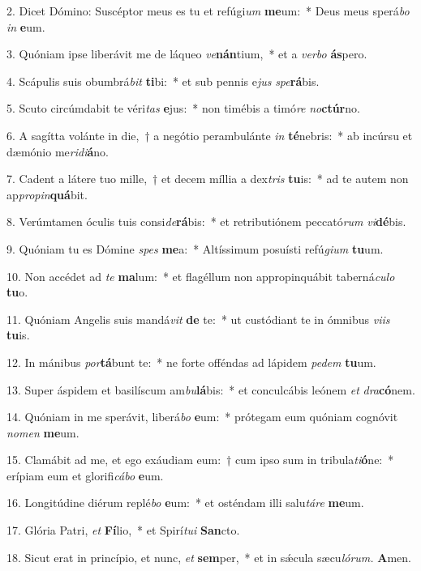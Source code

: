 \item 2. Dicet Dómino: Suscéptor meus es tu et refúgi\textit{um} \textbf{me}um:~* Deus meus sperá\textit{bo} \textit{in} \textbf{e}um.
\item 3. Quóniam ipse liberávit me de láqueo \textit{ve}\textbf{nán}tium,~* et a \textit{verbo} \textbf{ás}pero.
\item 4. Scápulis suis obumbrá\textit{bit} \textbf{ti}bi:~* et sub pennis e\textit{jus} \textit{spe}\textbf{rá}bis.
\item 5. Scuto circúmdabit te véri\textit{tas} \textbf{e}jus:~* non timébis a timó\textit{re} \textit{no}\textbf{ctúr}no.
\item 6. A sagítta volánte in die,~† a negótio perambulánte \textit{in} \textbf{té}nebris:~* ab incúrsu et dæmónio me\textit{ridi}\textbf{á}no.
\item 7. Cadent a látere tuo mille,~† et decem míllia a dex\textit{tris} \textbf{tu}is:~* ad te autem non ap\textit{propin}\textbf{quá}bit.
\item 8. Verúmtamen óculis tuis consi\textit{de}\textbf{rá}bis:~* et retributiónem peccató\textit{rum} \textit{vi}\textbf{dé}bis.
\item 9. Quóniam tu es Dómine \textit{spes} \textbf{me}a:~* Altíssimum posuísti refú\textit{gium} \textbf{tu}um.
\item 10. Non accédet ad \textit{te} \textbf{ma}lum:~* et flagéllum non appropinquábit taberná\textit{culo} \textbf{tu}o.
\item 11. Quóniam Angelis suis mandá\textit{vit} \textbf{de} te:~* ut custódiant te in ómnibus \textit{viis} \textbf{tu}is.
\item 12. In mánibus \textit{por}\textbf{tá}bunt te:~* ne forte offéndas ad lápidem \textit{pedem} \textbf{tu}um.
\item 13. Super áspidem et basilíscum am\textit{bu}\textbf{lá}bis:~* et conculcábis leónem \textit{et} \textit{dra}\textbf{có}nem.
\item 14. Quóniam in me sperávit, liberá\textit{bo} \textbf{e}um:~* prótegam eum quóniam cognóvit \textit{nomen} \textbf{me}um.
\item 15. Clamábit ad me, et ego exáudiam eum:~† cum ipso sum in tribula\textit{ti}\textbf{ó}ne:~* erípiam eum et glorifi\textit{cábo} \textbf{e}um.
\item 16. Longitúdine diérum replé\textit{bo} \textbf{e}um:~* et osténdam illi salu\hspace{0.03em}\textit{táre} \textbf{me}um.
\item 17. Glória Patri, \textit{et} \textbf{Fí}lio,~* et Spirí\hspace{0.03em}\textit{tui} \textbf{San}cto.
\item 18. Sicut erat in princípio, et nunc, \textit{et} \textbf{sem}per,~* et in sǽcula sæcu\hspace{0.03em}\textit{lórum.} \textbf{A}men.